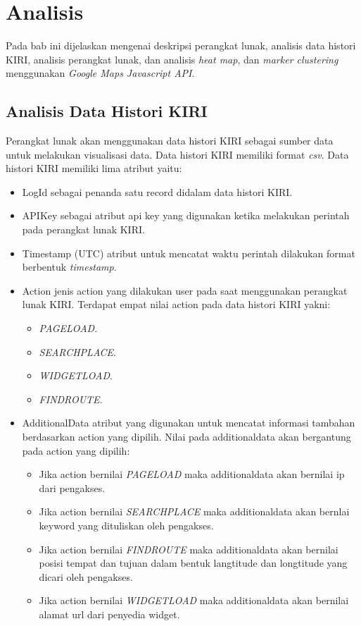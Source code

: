 \chapter{Analisis}
\label{chap:analisis}
Pada bab ini dijelaskan mengenai deskripsi perangkat lunak, analisis data histori KIRI, analisis perangkat lunak, dan analisis \textit{heat map}, dan \textit{marker clustering} menggunakan  \textit{Google Maps Javascript API}.


\section{Analisis Data Histori KIRI}
\label{sec:analisisDataHistoriKiri}
Perangkat lunak  akan menggunakan data histori KIRI sebagai sumber data untuk melakukan visualisasi data. Data histori KIRI memiliki format \textit{csv}. Data histori KIRI memiliki lima atribut yaitu:
\begin{itemize}
    \item LogId    sebagai penanda satu record didalam data histori KIRI.
    \item APIKey
    sebagai  atribut api key yang digunakan ketika melakukan perintah pada perangkat lunak KIRI.
    \item Timestamp (UTC)
    atribut untuk mencatat waktu perintah dilakukan format berbentuk \textit{timestamp}.
    \item Action
    jenis action yang dilakukan user pada saat menggunakan perangkat lunak KIRI. Terdapat empat nilai action pada data histori KIRI yakni:
    \begin{itemize}
        \item \textit{PAGELOAD}.
        \item \textit{SEARCHPLACE}.
        \item \textit{WIDGETLOAD}.
        \item \textit{FINDROUTE}.
    \end{itemize}
    \item AdditionalData atribut yang digunakan untuk mencatat informasi tambahan berdasarkan action yang dipilih. Nilai pada additionaldata akan bergantung pada action yang dipilih:
    \begin{itemize}
        \item Jika action bernilai \textit{PAGELOAD} maka additionaldata akan bernilai ip dari pengakses.
        \item Jika action bernilai \textit{SEARCHPLACE} maka additionaldata akan bernlai keyword yang dituliskan oleh pengakses.
        \item Jika action bernilai \textit{FINDROUTE} maka additionaldata akan bernilai posisi tempat dan tujuan dalam bentuk langtitude dan longtitude  yang dicari oleh pengakses.
        \item Jika action bernilai \textit{WIDGETLOAD} maka additionaldata akan bernilai alamat url dari penyedia widget.
    \end{itemize}
\end{itemize}



